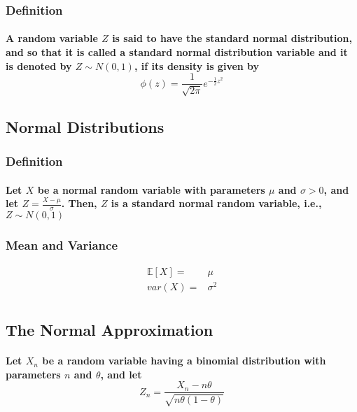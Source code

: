 \documentclass[titlepage]{article}
\begin{document}
            \subsubsection*{Definition}
                \paragraph{
                    A random variable $Z$ is said to have the standard normal distribution, and so that it is called a standard normal distribution variable and it is denoted by $Z\sim N(0,1)$, if its density is given by 
                    $$\phi(z)=\frac{1}{\sqrt{2\pi}}e^{-\frac{1}{2}z^2}$$
                } 
        \subsection{Normal Distributions}
            \subsubsection*{Definition}
                \paragraph{
                    Let $X$ be a normal random variable with parameters $\mu$ and $\sigma>0$, and let $Z=\frac{X-\mu}{\sigma}$. Then, $Z$ is a standard normal random variable, i.e., $Z\sim N(0,1)$
                }
            \subsubsection*{Mean and Variance}
                \begin{equation*}
                    \begin{split}
                        \mathbb{E}[X]=&\mu\\
                        var(X)=&\sigma^2\\
                    \end{split}
                \end{equation*}
        \subsection{The Normal Approximation}
            \paragraph{
                Let $X_n$ be a random variable having a binomial distribution with parameters $n$ and $\theta$, and let $$Z_n=\frac{X_n-n\theta}{\sqrt{n\theta(1-\theta)}}$$
            }
\end{document}
